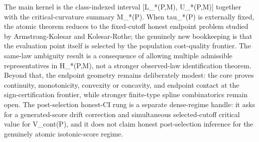 \documentclass{article}
\begin{document}
The main kernel is the class-indexed interval [L_*(P,M), U_*(P,M)] together with the critical-curvature summary M_*(P). When tau_*(P) is externally fixed, the atomic theorem reduces to the fixed-cutoff honest endpoint problem studied by Armstrong-Kolesar and Kolesar-Rothe; the genuinely new bookkeeping is that the evaluation point itself is selected by the population cost-quality frontier. The same-law ambiguity result is a consequence of allowing multiple admissible representatives in H_*(P,M), not a stronger observed-law identification theorem. Beyond that, the endpoint geometry remains deliberately modest: the core proves continuity, monotonicity, convexity or concavity, and endpoint contact at the sign-certification frontier, while stronger finite-type spline combinatorics remain open. The post-selection honest-CI rung is a separate dense-regime handle: it asks for a generated-score drift correction and simultaneous selected-cutoff critical value for V_cont(P), and it does not claim honest post-selection inference for the genuinely atomic isotonic-score regime.
\end{document}
